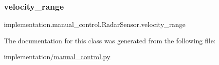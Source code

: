 \subsubsection{\texorpdfstring{velocity\+\_\+range}{velocity\_range}}
{\footnotesize\ttfamily implementation.\+manual\+\_\+control.\+Radar\+Sensor.\+velocity\+\_\+range}



The documentation for this class was generated from the following file\+:\begin{DoxyCompactItemize}
\item 
implementation/\hyperlink{manual__control_8py}{manual\+\_\+control.\+py}\end{DoxyCompactItemize}
